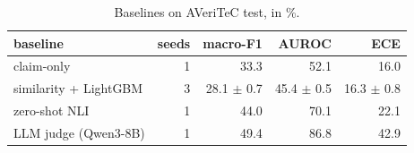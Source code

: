 \begin{table}[t]
\centering
\caption{Baselines on AVeriTeC test, in \%.}
\label{tab:tab_audit_averitec}
\begin{tabular}{lrrrr}
\toprule
baseline & seeds & macro-F1 & AUROC & ECE \\
\midrule
claim-only & 1 & 33.3 & 52.1 & 16.0 \\
similarity + LightGBM & 3 & 28.1 $\pm$ 0.7 & 45.4 $\pm$ 0.5 & 16.3 $\pm$ 0.8 \\
zero-shot NLI & 1 & 44.0 & 70.1 & 22.1 \\
LLM judge (Qwen3-8B) & 1 & 49.4 & 86.8 & 42.9 \\
\bottomrule
\end{tabular}
\end{table}

